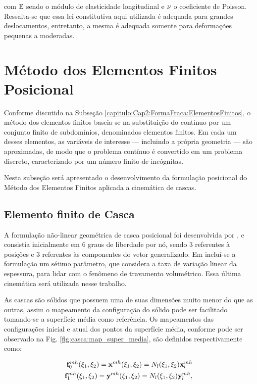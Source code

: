 \documentclass[tese_patricia]{subfiles}
\begin{document}
\noindent com $\mathbb{E}$ sendo o módulo de elasticidade longitudinal e $\nu$ o coeficiente de Poisson. Ressalta-se que essa lei constitutiva aqui utilizada é adequada para grandes deslocamentos, entretanto, a mesma é adequada somente para deformações pequenas a moderadas.

\section{Método dos Elementos Finitos Posicional}

Conforme discutido na Subseção \ref{capitulo:Cap2:FormaFraca:ElementosFinitos}, o método dos elementos finitos baseia-se na substituição do contínuo por um conjunto finito de subdomínios, denominados elementos finitos. Em cada um desses elementos, as variáveis de interesse — incluindo a própria geometria — são aproximadas, de modo que o problema contínuo é convertido em um problema discreto, caracterizado por um número finito de incógnitas.

Nesta subseção será apresentado o desenvolvimento da formulação posicional do Método dos Elementos Finitos aplicada a cinemática de cascas.

\subsection{Elemento finito de Casca} \label{capitulo:Cap4:Mef:Casca}

A formulação não-linear geométrica de casca posicional foi desenvolvida por , e consistia inicialmente em 6 graus de liberdade por nó, sendo 3 referentes à posições e 3 referentes às componentes do vetor generalizado. Em  incluí-se a formulação um sétimo parâmetro, que considera a taxa de variação linear da espessura, para lidar com o fenômeno de travamento volumétrico. Essa última cinemática será utilizada nesse trabalho.

As cascas são sólidos que possuem uma de suas dimensões muito menor do que as outras, assim o mapeamento da configuração do sólido pode ser facilitado tomando-se a superfície média como referência. Os mapeamentos das configurações inicial e atual dos pontos da superfície média, conforme pode ser observado na Fig. \ref{fig:casca:map_super_media}, são definidos respectivamente como:

\begin{align}
\mathbf{f}^{mh}_{0}(\xi_{1},\xi_{2}) = \mathbf{x}^{mh}(\xi_{1},\xi_{2}) = N_{l} (\xi_{1},\xi_{2}) \mathbf{x}_{l}^{mh}\label{eq:casca_Lposition_m}\\
\mathbf{f}^{mh}_{1}(\xi_{1},\xi_{2}) = \mathbf{y}^{mh}(\xi_{1},\xi_{2}) = N_{l} (\xi_{1},\xi_{2}) \mathbf{y}_{l}^{mh}, \label{eq:casca_Eposition_m}
\end{align}
\end{document}
